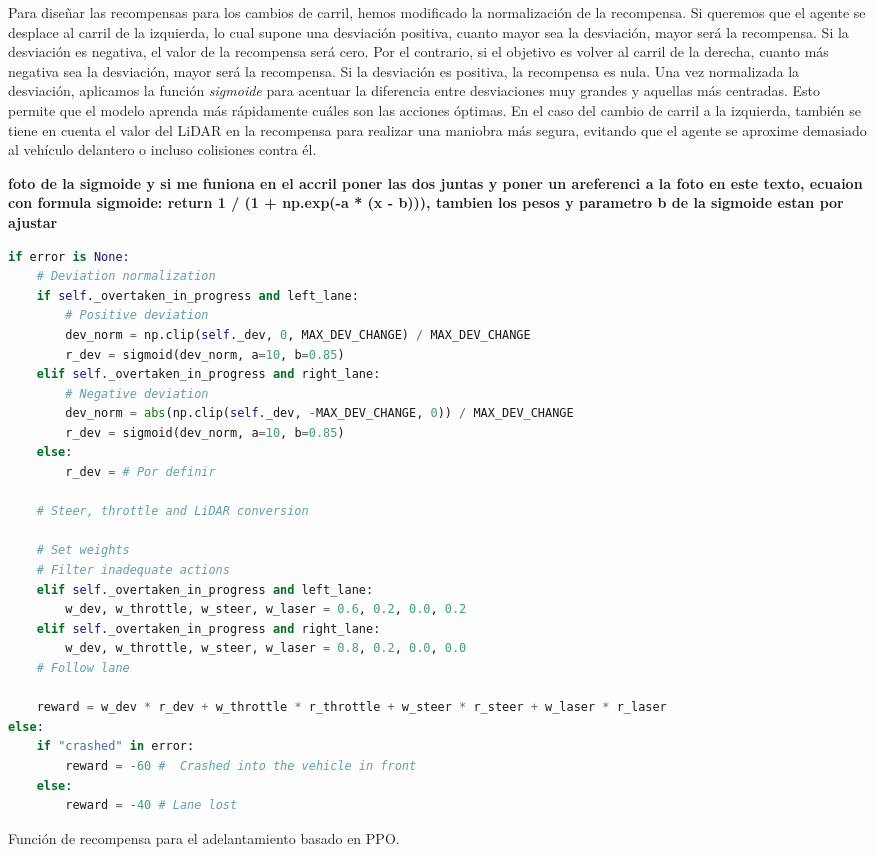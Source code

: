 Para diseñar las recompensas para los cambios de carril, hemos modificado la normalización de la recompensa. Si queremos que el agente se desplace al carril de la izquierda, lo cual supone una desviación positiva, cuanto mayor sea la desviación, mayor será la recompensa. Si la desviación es negativa, el valor de la recompensa será cero. Por el contrario, si el objetivo es volver al carril de la derecha, cuanto más negativa sea la desviación, mayor será la recompensa. Si la desviación es positiva, la recompensa es nula. Una vez normalizada la desviación, aplicamos la función \textit{sigmoide} para acentuar la diferencia entre desviaciones muy grandes y aquellas más centradas. Esto permite que el modelo aprenda más rápidamente cuáles son las acciones óptimas. En el caso del cambio de carril a la izquierda, también se tiene en cuenta el valor del \ac{LiDAR} en la recompensa para realizar una maniobra más segura, evitando que el agente se aproxime demasiado al vehículo delantero o incluso colisiones contra él.

\textbf{foto de la sigmoide y si me funiona en el accril poner las dos juntas y poner un areferenci a la foto en este texto, ecuaion con formula sigmoide: return 1 / (1 + np.exp(-a * (x - b))), tambien los pesos y parametro b de la sigmoide estan por ajustar}

\begin{code}[h]
\begin{lstlisting}[language=Python]
if error is None:
    # Deviation normalization
    if self._overtaken_in_progress and left_lane:
        # Positive deviation
        dev_norm = np.clip(self._dev, 0, MAX_DEV_CHANGE) / MAX_DEV_CHANGE
        r_dev = sigmoid(dev_norm, a=10, b=0.85)
    elif self._overtaken_in_progress and right_lane:
        # Negative deviation 
        dev_norm = abs(np.clip(self._dev, -MAX_DEV_CHANGE, 0)) / MAX_DEV_CHANGE
        r_dev = sigmoid(dev_norm, a=10, b=0.85)
    else:
        r_dev = # Por definir

    # Steer, throttle and LiDAR conversion

    # Set weights
    # Filter inadequate actions
    elif self._overtaken_in_progress and left_lane:
        w_dev, w_throttle, w_steer, w_laser = 0.6, 0.2, 0.0, 0.2
    elif self._overtaken_in_progress and right_lane:
        w_dev, w_throttle, w_steer, w_laser = 0.8, 0.2, 0.0, 0.0  
    # Follow lane

    reward = w_dev * r_dev + w_throttle * r_throttle + w_steer * r_steer + w_laser * r_laser
else:
    if "crashed" in error:
        reward = -60 #  Crashed into the vehicle in front
    else:
        reward = -40 # Lane lost
\end{lstlisting}
\caption[Función de recompensa para el adelantamiento basado en \ac{PPO}]{Función de recompensa para el adelantamiento basado en \ac{PPO}.}
\label{cod:rew_ppo_overtaken}
\end{code}

